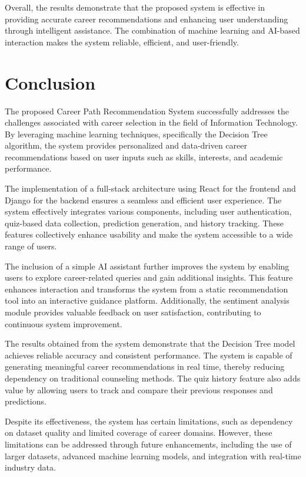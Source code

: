 \documentclass[12pt,a4paper]{report}
\begin{document}
{Overall, the results demonstrate that the proposed system is effective in providing accurate career recommendations and enhancing user understanding through intelligent assistance. The combination of machine learning and AI-based interaction makes the system reliable, efficient, and user-friendly.
\clearpage
\setcounter{page}{45}

\chapter{Conclusion}
\setlength{\parindent}{0pt}
\setlength{\parskip}{0.6em}
\justifying

The proposed Career Path Recommendation System successfully addresses the challenges associated with career selection in the field of Information Technology. By leveraging machine learning techniques, specifically the Decision Tree algorithm, the system provides personalized and data-driven career recommendations based on user inputs such as skills, interests, and academic performance.

The implementation of a full-stack architecture using React for the frontend and Django for the backend ensures a seamless and efficient user experience. The system effectively integrates various components, including user authentication, quiz-based data collection, prediction generation, and history tracking. These features collectively enhance usability and make the system accessible to a wide range of users.

The inclusion of a simple AI assistant further improves the system by enabling users to explore career-related queries and gain additional insights. This feature enhances interaction and transforms the system from a static recommendation tool into an interactive guidance platform. Additionally, the sentiment analysis module provides valuable feedback on user satisfaction, contributing to continuous system improvement.

The results obtained from the system demonstrate that the Decision Tree model achieves reliable accuracy and consistent performance. The system is capable of generating meaningful career recommendations in real time, thereby reducing dependency on traditional counseling methods. The quiz history feature also adds value by allowing users to track and compare their previous responses and predictions.

Despite its effectiveness, the system has certain limitations, such as dependency on dataset quality and limited coverage of career domains. However, these limitations can be addressed through future enhancements, including the use of larger datasets, advanced machine learning models, and integration with real-time industry data.

}
\end{document}
